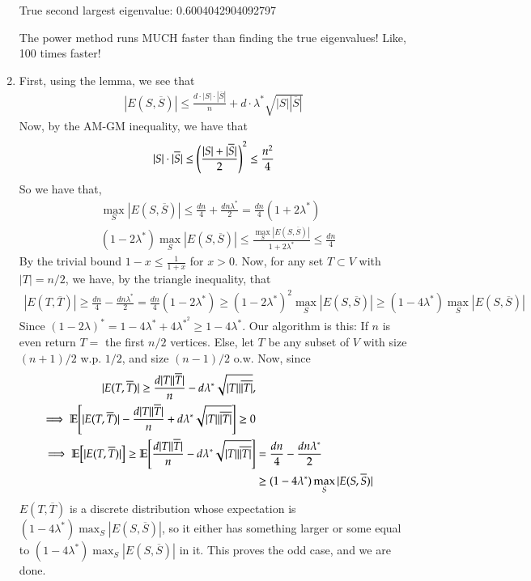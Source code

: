 \documentclass[12pt]{article}
\theoremstyle{definitionstyle}
\newcommand{\E}{\mathbb{E}\qty}
\begin{document}
\begin{enumerate}[leftmargin=\labelsep]
		True second largest eigenvalue:  0.6004042904092797
		
		The power method runs MUCH faster than finding the true eigenvalues! Like, 100 times faster!
		
		
		\item First, using the lemma, we see that
		\begin{align*}
			|E(S, \overline S)| \leq \frac{d \cdot |S| \cdot |\overline S|}{n} + d \cdot \lambda^* \sqrt{|S||\overline S|}
		\end{align*}
		Now, by the AM-GM inequality, we have that
		\begin{align*}
			|S| \cdot |\overline S| \leq \qty(\frac{|S|+|\overline S|}{2})^2 \leq \frac{n^2}{4}
		\end{align*}
		So we have that,
		\begin{align*}
			&\max_S|E(S, \overline S)| \leq \frac{dn}{4} + \frac{dn \lambda^*}{2} = \frac{dn}{4}(1+2\lambda^*) \\
			&(1-2\lambda^*)\max_S|E(S, \overline S)| \leq \frac{\max_S|E(S, \overline S)|}{1+2\lambda^*} \leq \frac{dn}{4}
		\end{align*}
		By the trivial bound $1-x \leq \frac{1}{1+x}$ for $x > 0$. Now, for any set $T \subset V$ with $|T| = n/2$, we have, by the triangle inequality, that
		\begin{align*}
			|E(T, \overline T)| \geq \frac{dn}{4} - \frac{d n \lambda^*}{2} = \frac{dn}{4}(1-2\lambda^*) \geq (1-2\lambda^*)^2 \max_S |E(S, \overline S)| \geq (1-4\lambda^*) \max_S |E(S, \overline S)|
		\end{align*}
		Since $(1-2\lambda)^* = 1 - 4\lambda^* + 4\lambda^{*^2} \geq 1-4\lambda^*$. Our algorithm is this: If $n$ is even return $T = $ the first $n/2$ vertices. Else, let $T$ be any subset of $V$ with size $(n+1)/2$ w.p. $1/2$, and size $(n-1)/2$ o.w. Now, since 
		\begin{align*}
			|E(T, \overline T)| \geq \frac{d |T||\overline T|}{n} - d\lambda^* \sqrt{|T||\overline{|T|}}, \\
			\implies \E[|E(T, \overline T)| - \frac{d |T||\overline T|}{n} + d\lambda^* \sqrt{|T||\overline{|T|}}] \geq 0 \\
			\implies \E[|E(T, \overline T)|] \geq \E[\frac{d |T||\overline T|}{n} - d\lambda^* \sqrt{|T||\overline{|T|}}] &= \frac{dn}{4} - \frac{d n \lambda^*}{2} \\&\geq (1-4\lambda^*) \max_S |E(S, \overline S)|
		\end{align*}
		$E(T,\overline T)$ is a discrete distribution whose expectation is $(1-4\lambda^*) \max_S |E(S, \overline S)|$, so it either has something larger or some equal to $(1-4\lambda^*) \max_S |E(S, \overline S)|$ in it. This proves the odd case, and we are done.
	\end{enumerate}
\end{document}
